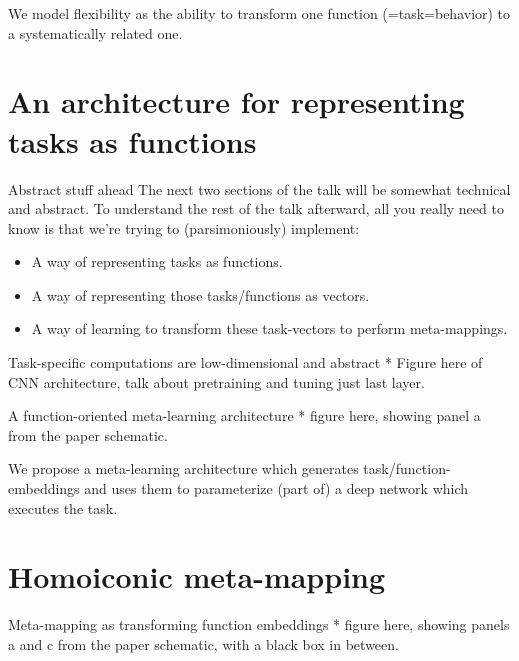 \documentclass{beamer}
\begin{document}
\begin{frame}[standout]
We model flexibility as the ability to transform one function (=task=behavior) to a systematically related one.
\end{frame}

\section{An architecture for representing tasks as functions}

\begin{frame}{Abstract stuff ahead}
The next two sections of the talk will be somewhat technical and abstract. To understand the rest of the talk afterward, all you really need to know is that we're trying to (parsimoniously) implement:
\begin{itemize}
\item A way of representing tasks as functions.
\item A way of representing those tasks/functions as vectors.
\item A way of learning to transform these task-vectors to perform meta-mappings.
\end{itemize}
\end{frame}

\begin{frame}{Task-specific computations are low-dimensional and abstract}
* Figure here of CNN architecture, talk about pretraining and tuning just last layer.
\end{frame}

\begin{frame}{A function-oriented meta-learning architecture}
* figure here, showing panel a from the paper schematic.
\end{frame}

\begin{frame}[standout]
We propose a meta-learning architecture which generates task/function-embeddings and uses them to parameterize (part of) a deep network which executes the task. %
\end{frame}

\section{Homoiconic meta-mapping}

\begin{frame}{Meta-mapping as transforming function embeddings}
* figure here, showing panels a and c from the paper schematic, with a black box in between.
\end{frame}
\end{document}
